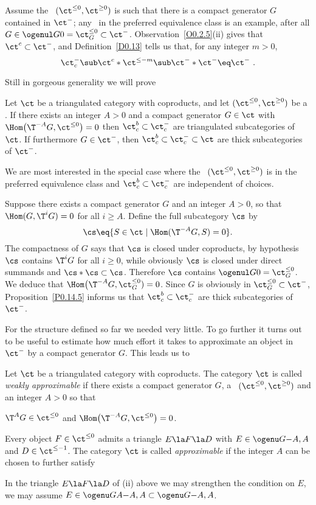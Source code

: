 \documentclass[11pt]{amsart}
\begin{document}
Assume the  \tstr\ $(\ct^{\leq0},\ct^{\geq0})$
is such that there is a compact generator
$G$ contained in $\ct^-$;
any \tstr\ in the preferred equivalence class
is an example, after all $G\in\ogenul G{}0=\ct_G^{\leq0}\subset\ct^-$.
Observation~\ref{O0.2.5}(ii)
gives that $\ct^c\subset\ct^-$, and 
 Definition~\ref{D0.13}
tells us that, for any integer $m>0$,
\[
\ct^-_c\sub\ct^c*\ct^{\leq-m}\sub \ct^-*\ct^-\eq\ct^-\ .
\]
\ermk

Still in gorgeous generality we will prove

Let $\ct$ be a triangulated category with coproducts, and
let $(\ct^{\leq0},\ct^{\geq0})$ be a \tstr. If there
exists an integer $A>0$ and a compact generator
$G\in\ct$ with $\Hom\big(\T^{-A}G,\ct^{\leq0}\big)=0$
then $\ct^b_c\subset\ct^-_c$ are triangulated subcategories of $\ct$.
If furthermore $G\in\ct^-$,
then $\ct^b_c\subset\ct^-_c\subset\ct$ are thick
subcategories of $\ct^-$.
\epro

We are most interested in the special case 
where the \tstr\ $(\ct^{\leq0},\ct^{\geq0})$
is in the preferred equivalence
class and $\ct^b_c\subset\ct^-_c$ are independent of choices.

Suppose there exists a compact generator $G$ and an integer $A>0$,
so that $\Hom(G,\T^iG)=0$ for
all $i\geq A$. Define the full subcategory $\cs$ by
\[
\cs\eq \{S\in\ct\mid\Hom(\T^{-A}G,S)=0\}.
\]
The compactness of $G$
says that $\cs$ is closed under coproducts, by hypothesis
$\cs$ contains $\T^iG$ for all $i\geq0$, while obviously $\cs$ is
closed under direct summands and $\cs*\cs\subset\cs$.
Therefore $\cs$ contains $\ogenul G{}0=\ct^{\leq0}_G$.
We deduce that $\Hom\big(\T^{-A}G,\ct^{\leq0}_G)=0$.
Since $G$ is obviously in $\ct^{\leq0}_G\subset\ct^-$,
Proposition~\ref{P0.14.5} informs us that $\ct^b_c\subset\ct^-_c$ are
thick subcategories of $\ct^-$.
\ermk

For the structure defined so far we needed very little. To go
further it turns out to be useful to estimate how much
effort it takes to approximate an object in $\ct^-$ by
a compact generator $G$. This leads us to


Let $\ct$ be a triangulated category with
coproducts.
The category $\ct$ is called
\emph{weakly approximable} if
there exists a compact generator $G$,  a
\tstr\ $(\ct^{\leq0},\ct^{\geq0})$
and an integer $A>0$ so that 
\be
\item
$\T^AG\in\ct^{\leq0}$ and $\Hom\big(\T^{-A}G,\ct^{\leq0}\big)=0$.
\item
Every object $F\in\ct^{\leq 0}$ admits a triangle
$E\la F\la D$ with $E\in\ogenu G{}{-A,A}$ and
$D\in\ct^{\leq-1}$.
\setcounter{enumiv}{\value{enumi}}
\ee
The category $\ct$ is called \emph{approximable} if the integer $A$
can be chosen to further satisfy
\be
\setcounter{enumi}{\value{enumiv}}
\item
In the triangle 
$E\la F\la D$ of (ii) above we may  
strengthen the condition on $E$, we may assume
$E\in\ogenu GA{-A,A}\subset\ogenu G{}{-A,A}$.
\setcounter{enumiv}{\value{enumi}}
\ee
\edfn
\end{document}
